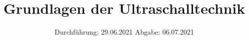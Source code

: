 

\subject{US1}
\title{Grundlagen der Ultraschalltechnik}
\date{%
  Durchführung: 29.06.2021
  \hspace{3em}
  Abgabe: 06.07.2021
}



\maketitle
\thispagestyle{empty}
\tableofcontents
\newpage




\nocite{*}
\printbibliography{}


